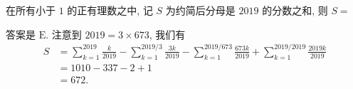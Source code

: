 \begin{prob}
\label{prob:prob-3}
在所有小于 $1$ 的正有理数之中,
记 $S$ 为约简后分母是 $2019$ 的分数之和, 则 $S = $
\end{prob}

\begin{soln}
答案是 $\boxed{\text{E}.}$
注意到 $2019 = 3 \times 673$, 我们有
\begin{align*}
S &= \sum_{k=1}^{2019} \frac{k}{2019} - \sum_{k=1}^{2019/3}\frac{3k}{2019}
   - \sum_{k=1}^{2019/673}\frac{673k}{2019} + \sum_{k=1}^{2019/2019}\frac{2019k}{2019}\\
  &=1010 - 337 - 2 + 1\\
  &=672.
\end{align*}
\end{soln}
